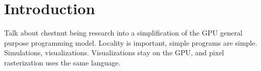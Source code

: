 \section{Introduction}


Talk about chestnut being research into a simplification of the GPU general purpose programming model. Locality is important, simple programs are simple. Simulations, visualizations. Visualizations stay on the GPU, and pixel rasterization uses the same language.
